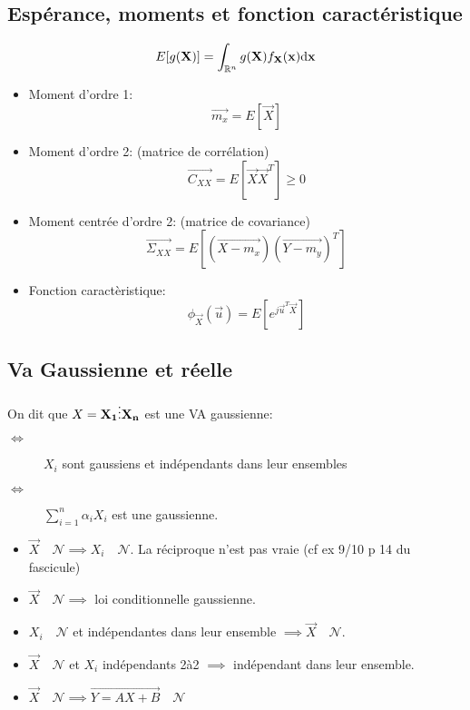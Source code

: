 \documentclass[main.tex]{subfiles}
\begin{document}
\subsection{Espérance, moments et fonction caractéristique}
\begin{thm}
  \[
    E[g(\vec{X})] = \int_{\R^n}^{}g(\vec{X})f_{\vec{X}}(\vec{x})\d\vec{x}
  \]
\end{thm}

\begin{defin}
  \begin{itemize}
  \item Moment d'ordre 1:
    \[
      \vec{m_x}= E[\vec{X}]
    \]
  \item Moment d'ordre 2: (matrice de corrélation)
    \[
      \vec{C_{XX}}=E[\vec{X}\vec{X}^T]\ge 0
    \]
  \item Moment centrée d'ordre 2: (matrice de covariance)
    \[
      \vec{\Sigma_{XX}} = E[(\vec{X-m_x})(\vec{Y-m_y})^T]
    \]
  \item Fonction caractèristique:
    \[
      \phi_{\vec{X}}(\vec{u})= E[e^{j\vec{u}^T\vec{X}}]
    \]
  \end{itemize}
\end{defin}
\subsection{Va Gaussienne et réelle}
\begin{defin}
  On dit que $X = \vec{X_1\\ \vdots\\ X_n}$ est une VA gaussienne:
  \begin{description}
  \item[$\iff$] $X_i$ sont gaussiens et indépendants dans leur ensembles
  \item[$\iff$] $\sum_{i=1}^{n} \alpha_iX_i$ est une gaussienne.
  \end{description}
\end{defin}

\renewcommand{\N}{\quad\mathcal{N}}
\begin{prop}
  \begin{itemize}
  \item $\vec{X} \N \implies X_i \N$. La réciproque n'est pas vraie (cf ex 9/10 p 14 du fascicule)
  \item $\vec{X} \N \implies $ loi conditionnelle gaussienne.
  \item $X_i \N$ et indépendantes dans leur ensemble $\implies \vec{X} \N$.
  \item $\vec{X} \N$ et $X_i$ indépendants 2à2 $\implies$ indépendant dans leur ensemble.
  \item $\vec{X} \N \implies \vec{ Y =AX+B } \N$
  \end{itemize}
\end{prop}
\end{document}

